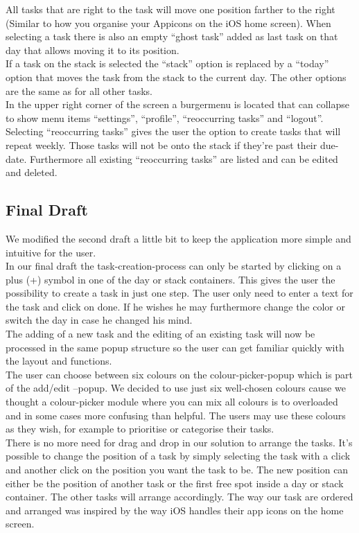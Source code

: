 All tasks that are right to the task will move one position farther to the right (Similar to how you organise your Appicons on the iOS home screen). 
When selecting a task there is also an empty “ghost task” added as last task on that day that allows moving it to its position. \\
If a task on the stack is selected the “stack” option is replaced by a “today” option that moves the task from the stack to the current day. The other options are the same as for all other tasks. \\
In the upper right corner of the screen a burgermenu is located that can collapse to show menu items “settings”, “profile”, “reoccurring tasks” and “logout”. \\
Selecting “reoccurring tasks” gives the user the option to create tasks that will repeat weekly. 
Those tasks will not be onto the stack if they’re past their due-date. 
Furthermore all existing “reoccurring tasks” are listed and can be edited and deleted. 

\subsection{Final Draft}

We modified the second draft a little bit to keep the application more simple and intuitive for the user. \\
In our final draft the task-creation-process can only be started by clicking on a plus (+) symbol in one of the day or stack containers. This gives the user the possibility to create a task in just one step. The user only need to enter a text for the task and click on done. If he wishes he may furthermore change the color or switch the day in case he changed his mind. \\
The adding of a new task and the editing of an existing task will now be processed in the same popup structure so the user can get familiar quickly with the layout and functions. \\
The user can choose between six colours on the colour-picker-popup which is part of the add/edit –popup. We decided to use just six well-chosen colours cause we thought a colour-picker module where you can mix all colours is to overloaded and in some cases more confusing than helpful. The users may use these colours as they wish, for example to prioritise or categorise their tasks. \\
There is no more need for drag and drop in our solution to arrange the tasks. It’s possible to change the position of a task by simply selecting the task with a click and another click on the position you want the task to be. The new position can either be the position of another task or the first free spot inside a day or stack container.  The other tasks will arrange accordingly. The way our task are ordered and arranged was inspired by the way iOS handles their app icons on the home screen. 



